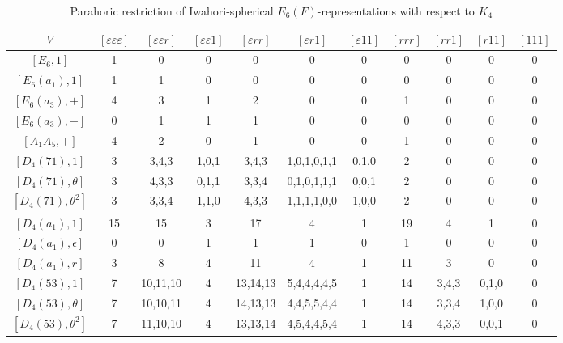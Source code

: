     \begin{table}[ht]
        \centering
        \caption{Parahoric restriction of Iwahori-spherical $E_6(F)$-representations with respect to $K_4$}
        \label{tab:e6_a2a2a2_restriction}
        \begin{adjustbox}{max width=\linewidth}
        \begin{tabular}{|c|cccccccccc|}
        \hline
        $V$ & $[\varepsilon\varepsilon\varepsilon]$ & $[\varepsilon\varepsilon r]$ & $[\varepsilon\varepsilon 1]$ & $[\varepsilon r r]$ & $[\varepsilon r 1]$ & $[\varepsilon 1 1]$ & $[r r r]$ & $[r r 1]$ & $[r 1 1]$ & $[1 1 1]$ \\ \hline
        $[E_6, 1]$             & 1 & 0 & 0 & 0 & 0 & 0 & 0 & 0 & 0 & 0 \\ \hline
        $[E_6(a_1), 1]$        & 1 & 1 & 0 & 0 & 0 & 0 & 0 & 0 & 0 & 0\\ \hline
        $[E_6(a_3), +]$        & 4 & 3 & 1 & 2 & 0 & 0 & 1 & 0 & 0 & 0\\ 
        $[E_6(a_3), -]$        & 0 & 1 & 1 & 1 & 0 & 0 & 0 & 0 & 0 & 0\\ 
        $[A_1A_5, +]$          & 4 & 2 & 0 & 1 & 0 & 0 & 1 & 0 & 0 & 0\\ \hline

        $[D_4(71), 1]$         & 3 & 3,4,3 & 1,0,1 & 3,4,3 & 1,0,1,0,1,1 & 0,1,0 & 2 & 0 & 0 & 0 \\ 
        $[D_4(71), \theta]$    & 3 & 4,3,3 & 0,1,1 & 3,3,4 & 0,1,0,1,1,1 & 0,0,1 & 2 & 0 & 0 & 0 \\
        $[D_4(71), \theta^2]$  & 3 & 3,3,4 & 1,1,0 & 4,3,3 & 1,1,1,1,0,0 & 1,0,0 & 2 & 0 & 0 & 0 \\ \hline

        $[D_4(a_1), 1]$        & 15 & 15 & 3 & 17 & 4 & 1 & 19 & 4 & 1 & 0 \\ 
        $[D_4(a_1), \epsilon]$  & 0 & 0 & 1 & 1 & 1 & 0 & 1 & 0 & 0 & 0\\ 
        $[D_4(a_1), r]$        & 3 & 8 & 4 & 11 & 4 & 1 & 11 & 3 & 0 & 0\\\hline

        $[D_4(53), 1]$         & 7 & 10,11,10 & 4 & 13,14,13 & 5,4,4,4,4,5 & 1 & 14 & 3,4,3 & 0,1,0 & 0 \\
        $[D_4(53), \theta]$    & 7 & 10,10,11 & 4 & 14,13,13 & 4,4,5,5,4,4 & 1 & 14 & 3,3,4 & 1,0,0 & 0 \\ 
        $[D_4(53), \theta^2]$  & 7 & 11,10,10 & 4 & 13,13,14 & 4,5,4,4,5,4 & 1 & 14 & 4,3,3 & 0,0,1 & 0 \\ \hline



\end{tabular}
\end{adjustbox}
\end{table}
